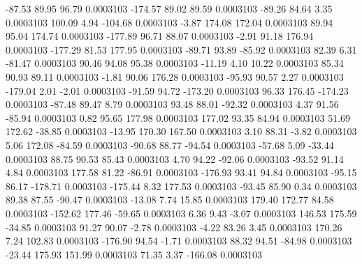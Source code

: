       -87.53       89.95       96.79     0.0003103
     -174.57       89.02       89.59     0.0003103
      -89.26       84.64        3.35     0.0003103
      100.09        4.94     -104.68     0.0003103
       -3.87      174.08      172.04     0.0003103
       89.94       95.04      174.74     0.0003103
     -177.89       96.71       88.07     0.0003103
       -2.91       91.18      176.94     0.0003103
     -177.29       81.53      177.95     0.0003103
      -89.71       93.89      -85.92     0.0003103
       82.39        6.31      -81.47     0.0003103
       90.46       94.08       95.38     0.0003103
      -11.19        4.10       10.22     0.0003103
       85.34       90.93       89.11     0.0003103
       -1.81       90.06      176.28     0.0003103
      -95.93       90.57        2.27     0.0003103
     -179.04        2.01       -2.01     0.0003103
      -91.59       94.72     -173.20     0.0003103
       96.33      176.45     -174.23     0.0003103
      -87.48       89.47        8.79     0.0003103
       93.48       88.01      -92.32     0.0003103
        4.37       91.56      -85.94     0.0003103
        0.82       95.65      177.98     0.0003103
      177.02       93.35       84.94     0.0003103
       51.69      172.62      -38.85     0.0003103
      -13.95      170.30      167.50     0.0003103
        3.10       88.31       -3.82     0.0003103
        5.06      172.08      -84.59     0.0003103
      -90.68       88.77      -94.54     0.0003103
      -57.68        5.09      -33.44     0.0003103
       88.75       90.53       85.43     0.0003103
        4.70       94.22      -92.06     0.0003103
      -93.52       91.14        4.84     0.0003103
      177.58       81.22      -86.91     0.0003103
     -176.93       93.41       94.84     0.0003103
      -95.15       86.17     -178.71     0.0003103
     -175.44        8.32      177.53     0.0003103
      -93.45       85.90        0.34     0.0003103
       89.38       87.55      -90.47     0.0003103
      -13.08        7.74       15.85     0.0003103
      179.40      172.77       84.58     0.0003103
     -152.62      177.46      -59.65     0.0003103
        6.36        9.43       -3.07     0.0003103
      146.53      175.59      -34.85     0.0003103
       91.27       90.07       -2.78     0.0003103
       -4.22       83.26        3.45     0.0003103
      170.26        7.24      102.83     0.0003103
     -176.90       94.54       -1.71     0.0003103
       88.32       94.51      -84.98     0.0003103
      -23.44      175.93      151.99     0.0003103
       71.35        3.37     -166.08     0.0003103
